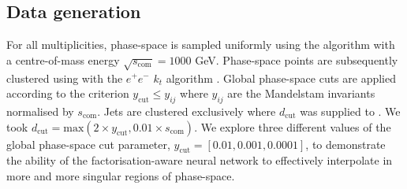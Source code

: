 \documentclass[main.tex]{subfiles}
\begin{document}
\subsection{Data generation}\label{sec:data}
For all multiplicities, phase-space is sampled uniformly using the {\RAMBO} algorithm \cite{Kleiss:1985gy} with a centre-of-mass energy $\sqrt{s_{\mathrm{com}}} = 1000$ GeV.
Phase-space points are subsequently clustered using {\FastJet} \cite{Cacciari:2011ma,noel_dawe_2021_4446849} with the $e^{+}e^{-}$ $k_{t}$ algorithm \cite{Catani:1991hj}.
Global phase-space cuts are applied according to the criterion $y_{\mathrm{cut}} \leq y_{ij}$ where $y_{ij}$ are the Mandelstam invariants normalised by $s_{\mathrm{com}}$.
Jets are clustered exclusively where $d_{\mathrm{cut}}$ was supplied to {\FastJet}. We took $d_{\mathrm{cut}} = \mathrm{max}(2 \times y_{\mathrm{cut}}, 0.01 \times s_{\mathrm{com}})$.
We explore three different values of the global phase-space cut parameter, $y_{\mathrm{cut}} = [0.01, 0.001, 0.0001]$, to demonstrate the ability of the factorisation-aware neural network to effectively interpolate in more and more singular regions of phase-space.
\end{document}
